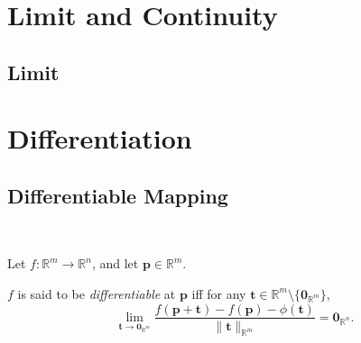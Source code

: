 \chapter{Limit and Continuity}


\section{Limit}


\begin{theorem}
	\label{thm: limit: exists alpha}
\end{theorem}







\chapter{Differentiation}


\section{Differentiable Mapping}


\begin{definition}
	\label{def: differentiable mappings}
	\
	
	Let $f:\mathbb R^m \to \mathbb R^n$, and let $\mathbf p \in \mathbb R^m$.
	
	$f$ is said to be \textit{differentiable} at $\mathbf p$ iff for any $\mathbf t \in \mathbb R^m \setminus \{ \mathbf 0_{\mathbb R^m} \}$,
	$$
	\lim_{\mathbf t \to \mathbf 0_{\mathbb R^m}} \frac{f(\mathbf p + \mathbf t) - f(\mathbf p) - \phi(\mathbf t)}{\| \mathbf t \|_{\mathbb R^m}} = \mathbf 0_{\mathbb R^n}.
	$$
\end{definition}


